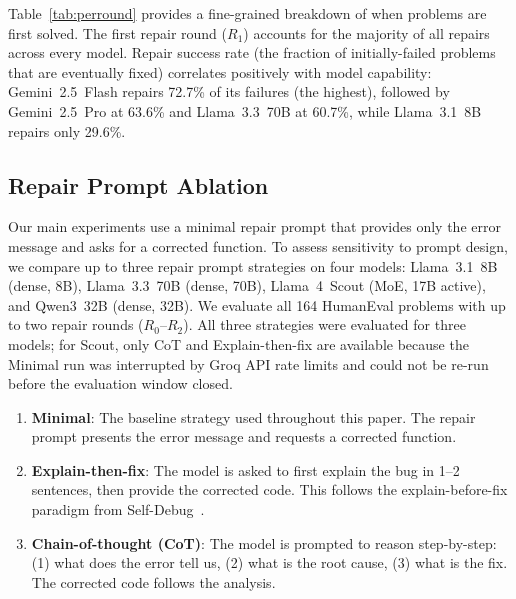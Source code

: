 \documentclass[conference]{IEEEtran}
\begin{document}
Table~\ref{tab:perround} provides a fine-grained breakdown of when problems are first solved. The first repair round ($R_1$) accounts for the majority of all repairs across every model. Repair success rate (the fraction of initially-failed problems that are eventually fixed) correlates positively with model capability: Gemini~2.5~Flash repairs 72.7\% of its failures (the highest), followed by Gemini~2.5~Pro at 63.6\% and Llama~3.3~70B at 60.7\%, while Llama~3.1~8B repairs only 29.6\%.

\subsection{Repair Prompt Ablation}

Our main experiments use a minimal repair prompt that provides only the error message and asks for a corrected function. To assess sensitivity to prompt design, we compare up to three repair prompt strategies on four models: Llama~3.1~8B (dense, 8B), Llama~3.3~70B (dense, 70B), Llama~4~Scout (MoE, 17B active), and Qwen3~32B (dense, 32B). We evaluate all 164 HumanEval problems with up to two repair rounds ($R_0$--$R_2$). All three strategies were evaluated for three models; for Scout, only CoT and Explain-then-fix are available because the Minimal run was interrupted by Groq API rate limits and could not be re-run before the evaluation window closed.

\begin{enumerate}
    \item \textbf{Minimal}: The baseline strategy used throughout this paper. The repair prompt presents the error message and requests a corrected function.
    \item \textbf{Explain-then-fix}: The model is asked to first explain the bug in 1--2 sentences, then provide the corrected code. This follows the explain-before-fix paradigm from Self-Debug~\cite{chen2024teaching}.
    \item \textbf{Chain-of-thought (CoT)}: The model is prompted to reason step-by-step: (1) what does the error tell us, (2) what is the root cause, (3) what is the fix. The corrected code follows the analysis.
\end{enumerate}
\end{document}
